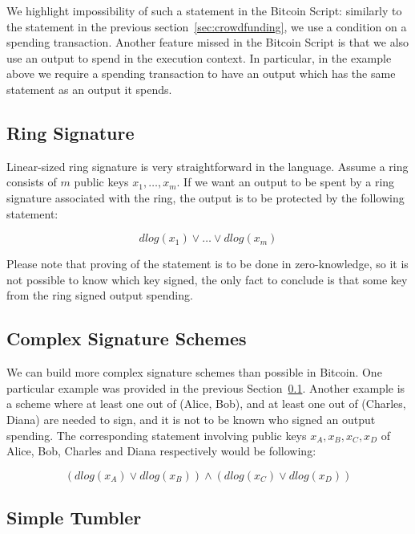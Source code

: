 \documentclass[11pt]{article}
\begin{document}
We highlight impossibility of such a statement in the Bitcoin Script: similarly to the statement in the previous section~\ref{sec:crowdfunding}, we use a condition on a spending transaction. Another feature missed in the Bitcoin Script is that we also use an output to spend in the execution context. In particular, in the example above we require a spending transaction to have an output which has the same statement as an output it spends. 

\subsection{Ring Signature}
\label{sec:ring}

Linear-sized ring signature is very straightforward in the language. Assume a ring consists of $m$ public keys $x_1, \dots, x_m$. If we want an output to be spent by a ring signature associated with the ring, the output is to be protected by the following statement:

$$dlog(x_1) \lor \dots \lor dlog(x_m)$$  

Please note that proving of the statement is to be done in zero-knowledge, so it is not possible to know which key signed, the only fact to conclude is that some key from the ring signed output spending. 

\subsection{Complex Signature Schemes}

We can build more complex signature schemes than possible in Bitcoin. One particular example was provided in the previous Section~\ref{sec:ring}. Another example is a scheme where at least one out of (Alice, Bob), and at least one out of (Charles, Diana) are needed to sign, and it is not to be known who signed an output spending. The corresponding statement involving public keys $x_A, x_B, x_C, x_D$ of Alice, Bob, Charles and Diana respectively would be following:

$$(dlog(x_A) \lor dlog(x_B)) \land (dlog(x_C) \lor dlog(x_D))$$

\subsection{Simple Tumbler}
\label{sec:tumbler}
\end{document}
